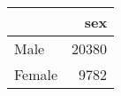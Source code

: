 \begin{tabular}{lr}
\toprule
{} &    sex \\
\midrule
 Male   &  20380 \\
 Female &   9782 \\
\bottomrule
\end{tabular}
